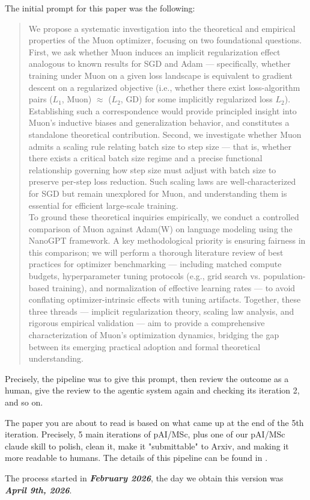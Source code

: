 \documentclass{article}
\begin{document}
\begin{summarybox}
The initial prompt for this paper was the following:
\begin{quote}
    We propose a systematic investigation into the theoretical and empirical properties of the Muon optimizer, focusing on two foundational questions. First, we ask whether Muon induces an implicit regularization effect analogous to known results for SGD and Adam — specifically, whether training under Muon on a given loss landscape is equivalent to gradient descent on a regularized objective (i.e., whether there exist loss-algorithm pairs ($L_1$, Muon) $\approx$ ($L_2$, GD) for some implicitly regularized loss $L_2$). Establishing such a correspondence would provide principled insight into Muon’s inductive biases and generalization behavior, and constitutes a standalone theoretical contribution. Second, we investigate whether Muon admits a scaling rule relating batch size to step size — that is, whether there exists a critical batch size regime and a precise functional relationship governing how step size must adjust with batch size to preserve per-step loss reduction. Such scaling laws are well-characterized for SGD but remain unexplored for Muon, and understanding them is essential for efficient large-scale training. \\

    To ground these theoretical inquiries empirically, we conduct a controlled comparison of Muon against Adam(W) on language modeling using the NanoGPT framework. A key methodological priority is ensuring fairness in this comparison; we will perform a thorough literature review of best practices for optimizer benchmarking — including matched compute budgets, hyperparameter tuning protocols (e.g., grid search vs. population-based training), and normalization of effective learning rates — to avoid conflating optimizer-intrinsic effects with tuning artifacts. Together, these three threads — implicit regularization theory, scaling law analysis, and rigorous empirical validation — aim to provide a comprehensive characterization of Muon’s optimization dynamics, bridging the gap between its emerging practical adoption and formal theoretical understanding.
\end{quote}

Precisely, the pipeline was to give this prompt, then review the outcome as a human, give the review to the agentic system again and checking its iteration 2, and so on.

The paper you are about to read is based on what came up at the end of the 5th iteration. Precisely, 5 main iterations of pAI/MSc, plus one of our pAI/MSc claude skill to polish, clean it, make it "submittable" to Arxiv, and making it more readable to humans. The details of this pipeline can be found in \citep{abdelmoneum2026paimsc}.

The process started in \textbf{\textit{February 2026}}, the day we obtain this version was \textbf{\textit{April 9th, 2026}}. 

\end{summarybox}
\end{document}
